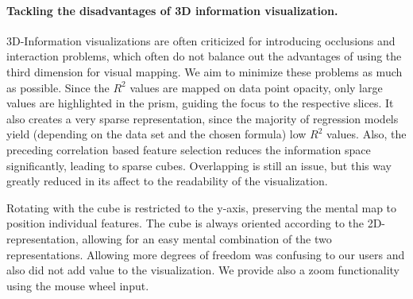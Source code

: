 \documentclass[journal]{style/vgtc} 			          %
\begin{document}
\paragraph{Tackling the disadvantages of 3D information visualization.}
3D-Information visualizations are often criticized for introducing occlusions and interaction problems, which often do not balance out the advantages of using the third dimension for visual mapping.
We aim to minimize these problems as much as possible.
Since the $R^2$ values are mapped on data point opacity, only large values are highlighted in the prism, guiding the focus to the respective slices.
It also creates a very sparse representation, since the majority of regression models yield (depending on the data set and the chosen formula) low $R^2$ values.
Also, the preceding correlation based feature selection reduces the information space significantly, leading to sparse cubes.
Overlapping is still an issue, but this way greatly reduced in its affect to the readability of the visualization.

Rotating with the cube is restricted to the y-axis, preserving the mental map to position individual features.
The cube is always oriented according to the 2D-representation, allowing for an easy mental combination of the two representations.
Allowing more degrees of freedom was confusing to our users and also did not add value to the visualization.
We provide also a zoom functionality using the mouse wheel input.
\end{document}
